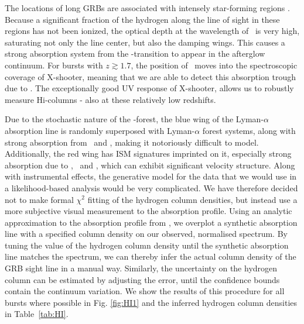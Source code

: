 \documentclass[longauth]{aa}    %
\begin{document}
The locations of long GRBs are associated with intensely star-forming regions
\citep{Hogg1999, Bloom2002, Fruchter2006, Lyman2017}. Because a significant fraction
of the hydrogen along the line of sight in these regions has not been ionized,
the optical depth at the wavelength of \lya~is very high, saturating not only
the line center, but also the damping wings. This causes a strong absorption
system from the \lya-transition to appear in the afterglow continuum. For bursts
with $z \gtrsim 1.7$, the position of \lya~moves into the spectroscopic coverage
of X-shooter, meaning that we are able to detect this absorption trough due to
\lya. The exceptionally good UV response of X-shooter, allows us to robustly
measure H{\sc i}-columns - also at these relatively low redshifts.

Due to the stochastic nature of the \lya-forest, the blue wing of the
Lyman-$\alpha$ absorption line is randomly superposed with Lyman-$\alpha$ forest
systems, along with strong absorption from \mnii~and \SIiii, making it
notoriously difficult to model. Additionally, the red wing has ISM signatures
imprinted on it, especially strong absorption due to \SIii, \sii~and \nv, which
can exhibit significant velocity structure. Along with instrumental effects, the
generative model for the data that we would use in a likelihood-based analysis
would be very complicated. We have therefore decided not to make formal $\chi^2$
fitting of the hydrogen column densities, but instead use a more subjective
visual measurement to the absorption profile. Using an analytic approximation to
the absorption profile from \citet{TepperGarcia2006}, we overplot a synthetic
absorption line with a specified column density on our observed, normalised
spectrum. By tuning the value of the hydrogen column density until the synthetic
absorption line matches the spectrum, we can thereby infer the actual column
density of the GRB sight line in a manual way. Similarly, the uncertainty on the
hydrogen column can be estimated by adjusting the error, until the confidence
bounds contain the continuum variation. We show the results of this procedure
for all bursts where possible in Fig. \ref{fig:HI1} and the inferred hydrogen
column densities in Table~\ref{tab:HI}.
\end{document}
